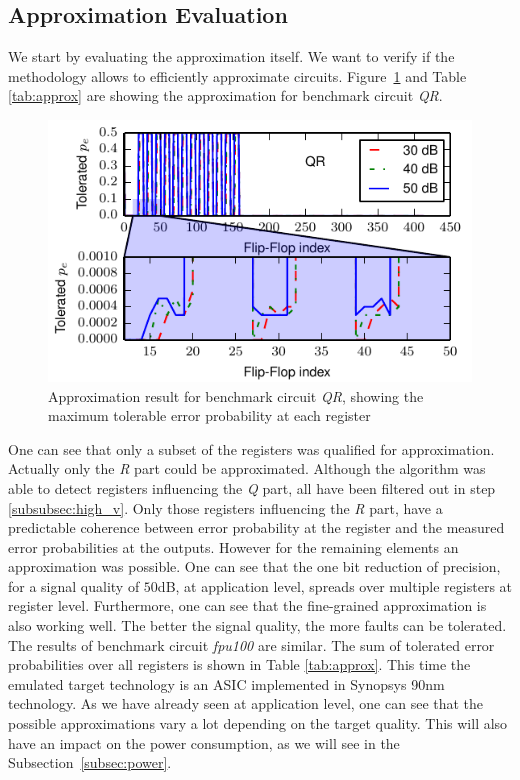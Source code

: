 \documentclass[conference]{IEEEtran}
\begin{document}
\subsection{Approximation Evaluation}
We start by evaluating the approximation itself. We want to verify if the methodology allows to efficiently approximate circuits.
Figure~\ref{fig:optimization_qr} and Table \ref{tab:approx} are showing the approximation for benchmark circuit \emph{QR}. 
\begin{figure}[htb]
  \centering
  \includegraphics[width=.48\textwidth]{figs/optimization_qr}
  \caption{Approximation result for benchmark circuit \emph{QR}, showing the maximum tolerable error probability at each register}
  \label{fig:optimization_qr}
\end{figure}
One can see that only a subset of the registers was qualified for approximation. Actually only the \emph{R} part could be approximated. Although the algorithm was able to detect registers influencing the \emph{Q} part, all have been filtered out in step \ref{subsubsec:high_v}. Only those registers influencing the \emph{R} part, have a predictable coherence between error probability at the register and the measured error probabilities at the outputs. However for the remaining elements an approximation was possible. One can see that the one bit reduction of precision, for a signal quality of $50$dB, at application level, spreads over multiple registers at register level. Furthermore, one can see that the fine-grained approximation is also working well. The better the signal quality, the more faults can be tolerated.
The results of benchmark circuit \emph{fpu100} are similar. The sum of tolerated error probabilities over all registers is shown in Table \ref{tab:approx}. This time the emulated target technology is an ASIC implemented in Synopsys 90nm technology. As we have already seen at application level, one can see that the possible approximations vary a lot depending on the target quality. This will also have an impact on the power consumption, as we will see in the Subsection~\ref{subsec:power}.
\end{document}
